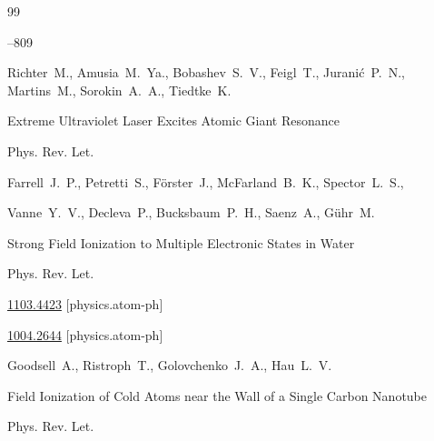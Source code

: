 \begin{thebibliography}{99}



--809






\by Richter~M.,  Amusia~M.~Ya., Bobashev~S.~V.,  Feigl~T., Jurani\'c~P.~N., Martins~M., Sorokin~A.~A.,   Tiedtke~K.

\paper Extreme Ultraviolet Laser Excites Atomic Giant Resonance 

\jour Phys. Rev. Let.  











\by Farrell~J.~P., Petretti~S., F\"orster~J., McFarland~B.~K., Spector~L.~S., 

Vanne~Y.~V., Decleva~P., Bucksbaum~P.~H., Saenz~A., G\"uhr~M.

\paper Strong Field Ionization to Multiple Electronic States in Water 

\jour Phys. Rev. Let. 





\arxiv \href{http://arxiv.org/abs/1103.4423}{1103.4423} [physics.atom-ph]







\arxiv \href{http://arxiv.org/abs/1004.2644}{1004.2644} [physics.atom-ph]

\by Goodsell~A., Ristroph~T., Golovchenko~J.~A., Hau~L.~V.

\paper Field Ionization of Cold Atoms near the Wall of a Single Carbon Nanotube 

\jour Phys. Rev. Let. 




\end{thebibliography}
